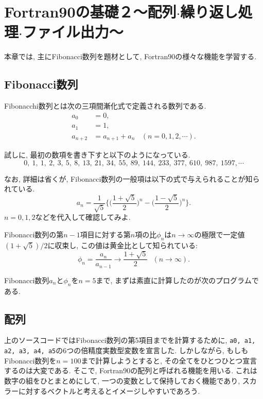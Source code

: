 \chapter{Fortran90の基礎２〜配列$\cdot$繰り返し処理$\cdot$ファイル出力〜}

本章では, 主にFibonacci数列を題材として, Fortran90の様々な機能を学習する. 

\section{Fibonacci数列}
Fibonacchi数列とは次の三項間漸化式で定義される数列である. 
\begin{equation}
\begin{split}
a_0&=0, \\
a_1&=1, \\
a_{n+2}&=a_{n+1}+a_{n} \ \ \ \ (n=0, 1, 2, \cdots). 
\end{split}
\end{equation}

試しに, 最初の数項を書き下すと以下のようになっている. 
\[
0, \ 1, \ 1, \ 2, \ 3, \ 5, \ 8, \ 13, \ 21, \ 34, \ 55, \ 89, \ 144, \ 233, \ 377, \ 610, \ 987, \ 1597, \cdots
\]

なお, 詳細は省くが, Fibonacci数列の一般項は以下の式で与えられることが知られている. 
\begin{equation}
a_n=\frac{1}{\sqrt{5}} \Bigg\{ \Bigg( \frac{1+\sqrt{5}}{2}\Bigg)^n- \Bigg( \frac{1-\sqrt{5}}{2}\Bigg)^n \Bigg\}. 
\end{equation}
$n=0, 1, 2$などを代入して確認してみよ. 


Fibonacci数列の第$n-1$項目に対する第$n$項の比$\phi_n$は$n\to \infty$の極限で一定値$(1+\sqrt{5})/2$に収束し, 
この値は黄金比として知られている: 
\begin{equation}
\phi_n = \frac{a_n}{a_{n-1}} \to \frac{1+\sqrt{5}}{2} \ \ \ (n \to \infty). 
\end{equation}

Fibonacci数列$a_n$と$\phi_n$を$n=5$まで, まずは素直に計算したのが次のプログラムである. 




\section{配列}
上のソースコードではFibonacci数列の第5項目までを計算するために, 
\verb|a0, a1, a2, a3, a4, a5|の6つの倍精度実数型変数を宣言した. 
しかしながら, もしもFibonacci数列を$n=100$まで計算しようとすると, 
その全てをひとつひとつ宣言するのは大変である. 
そこで, Fortran90の配列と呼ばれる機能を用いる. 
これは数字の組をひとまとめにして, 一つの変数として保持しておく機能であり, 
スカラーに対するベクトルと考えるとイメージしやすいであろう. 

